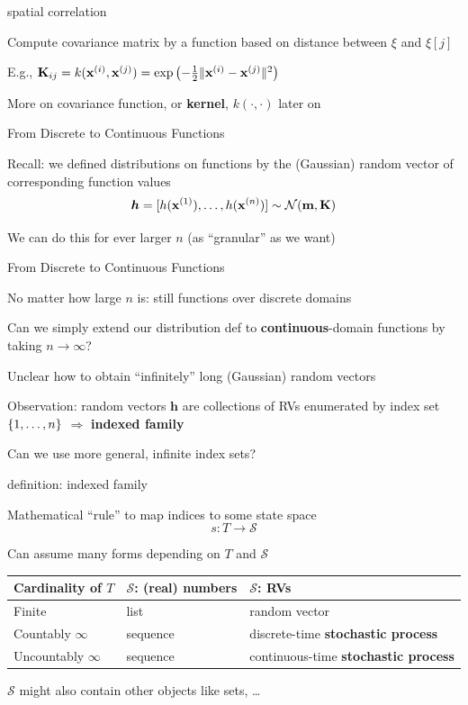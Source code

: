 \documentclass[11pt,compress,t,notes=noshow, xcolor=table]{beamer}
\begin{document}
\begin{framei}[sep=L]{spatial correlation}
\item Compute covariance matrix by a function based on distance between $\xi$ and $\xi[j]$
\item E.g., $\Kmat_{ij} = k(\xi, \xi[j]) = \exp \left(- \tfrac{1}{2} \| \xi - \xi[j] \|^2 \right)$
\vfill
{}
\item More on covariance function, or \textbf{kernel}, $k(\cdot, \cdot)$ later on
\end{framei} 

\begin{framei}{From Discrete to Continuous Functions}
\item Recall: we defined distributions on functions by the (Gaussian) random vector of corresponding function values 
$$\bm{h} = [h(\xi[1]), \dots, h(\xi[n])] \sim \gaussmk$$
\item We can do this for ever larger $n$ (as ``granular'' as we want)
\vfill
{}
\end{framei}

\begin{framei}[sep = L]{From Discrete to Continuous Functions}
\item No matter how large $n$ is: still functions over discrete domains
\item Can we simply extend our distribution def to \textbf{continuous}-domain functions by taking $n \rightarrow \infty$?
\item Unclear how to obtain ``infinitely'' long (Gaussian) random vectors
\item Observation: random vectors $\bm{h}$ are collections of RVs enumerated by index set $\nset$ $\Rightarrow$ \textbf{indexed family} 
\item Can we use more general, infinite index sets? %
\end{framei}

\begin{framei}{definition: indexed family}
\item Mathematical ``rule'' to map indices to some state space %
$$s: T \rightarrow \mathcal{S}$$ 
\item Can assume many forms depending on $T$ and $\mathcal{S}$
\vfill
\begin{tabular}{|l|l|l|}
\hline
\textbf{Cardinality of $T$} & \textbf{$\mathcal{S}$: (real) numbers} & \textbf{$\mathcal{S}$: RVs} \\
\hline
Finite & list & random vector \\
\hline
Countably $\infty$ & sequence & discrete-time \textbf{stochastic process} \\
\hline
Uncountably $\infty$ & sequence & continuous-time \textbf{stochastic process} \\
\hline
\end{tabular}
\vfill
\item $\mathcal{S}$ might also contain other objects like sets, \dots
\end{framei}
\end{document}
